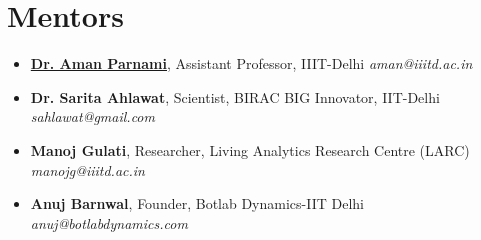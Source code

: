 \documentclass[10pt]{report}
\begin{document}
\section*{\color{BlueViolet}\faUsers\hspace{1pt} Mentors}%
\begin{itemize}

\item\href{http://amanparnami.com/}{\color{black}\textbf{Dr. Aman Parnami}}, Assistant Professor, IIIT-Delhi
\hfill\textit{aman@iiitd.ac.in}  

\item\textbf{Dr. Sarita Ahlawat}, Scientist, BIRAC BIG Innovator, IIT-Delhi
\hfill\textit{sahlawat@gmail.com} 

\item\textbf{Manoj Gulati}, Researcher, Living Analytics Research Centre (LARC)
\hfill\textit{manojg@iiitd.ac.in}  

\item\textbf{Anuj Barnwal}, Founder, Botlab Dynamics-IIT Delhi
\hfill\textit{anuj@botlabdynamics.com} 
\end{itemize}
\\%
\end{document}
